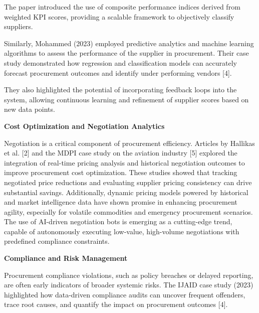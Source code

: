 \documentclass[10pt, onecolumn]{article}
\begin{document}
\vspace{\baselineskip}
The paper introduced the use of composite performance indices derived from weighted KPI scores, providing a scalable framework to objectively classify suppliers.
\vspace{\baselineskip}

Similarly, Mohammed (2023) employed predictive analytics and machine learning algorithms to assess the performance of the supplier in procurement. Their case study demonstrated how regression and classification models can accurately forecast procurement outcomes and identify under performing vendors [4].

\vspace{\baselineskip}
They also highlighted the potential of incorporating feedback loops into the system, allowing continuous learning and refinement of supplier scores based on new data points.
\vspace{\baselineskip}

\noindent\textbf{Cost Optimization and Negotiation Analytics}
\vspace{\baselineskip}

Negotiation is a critical component of procurement efficiency. Articles by Hallikas et al. [2] and the MDPI case study on the aviation industry [5] explored the integration of real-time pricing analysis and historical negotiation outcomes to improve procurement cost optimization. These studies showed that tracking negotiated price reductions and evaluating supplier pricing consistency can drive substantial savings.
\vspace{\baselineskip}
Additionally, dynamic pricing models powered by historical and market intelligence data have shown promise in enhancing procurement agility, especially for volatile commodities and emergency procurement scenarios.
\vspace{\baselineskip}
The use of AI-driven negotiation bots is emerging as a cutting-edge trend, capable of autonomously executing low-value, high-volume negotiations with predefined compliance constraints.
\vspace{\baselineskip}


\noindent\textbf{Compliance and Risk Management}
\vspace{\baselineskip}

Procurement compliance violations, such as policy breaches or delayed reporting, are often early indicators of broader systemic risks. The IJAID case study (2023) highlighted how data-driven compliance audits can uncover frequent offenders, trace root causes, and quantify the impact on procurement outcomes [4].
\end{document}
